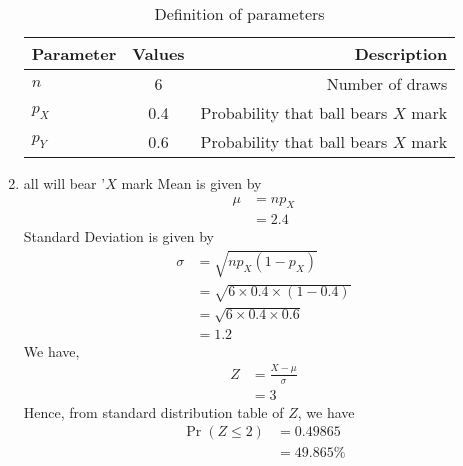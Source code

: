 \documentclass[journal,12pt,onecolumn]{IEEEtran}
\theoremstyle{remark}
\begin{document}
\begin{enumerate}
\begin{table}[!ht]
\centering
\begin{tabular}{|l|c|r|}
    \hline
    Parameter & Values & Description\\
    \hline
    $n$ & 6 & Number of draws\\
    \hline
    $p_X$ & 0.4 & Probability that ball bears $X$ mark \\
    \hline
    $p_Y$ & 0.6 & Probability that ball bears $X$ mark \\
    \hline
\end{tabular}
\caption{Definition of parameters}
\label{tab:gaussian/9/3/17}
\end{table}
\item all will bear '$X$ mark
Mean is given by
\begin{align}
	\mu &= np_X \\
	&= 2.4
\end{align}
Standard Deviation is given by
\begin{align}
	\sigma &= \sqrt{np_X(1 - p_X)}\\
	&= \sqrt{6 \times 0.4 \times (1 - 0.4)} \\
	&= \sqrt{6 \times 0.4 \times 0.6}\\
	&=  1.2
\end{align}
We have,
\begin{align}
	Z &= \frac{X - \mu}{\sigma} \\
	&= 3
\end{align}
Hence, from standard distribution table of $Z$, we have
\begin{align}
	\Pr(Z \le 2) &= 0.49865\\
	&= 49.865\%
\end{align}



\end{enumerate}
\end{document}
